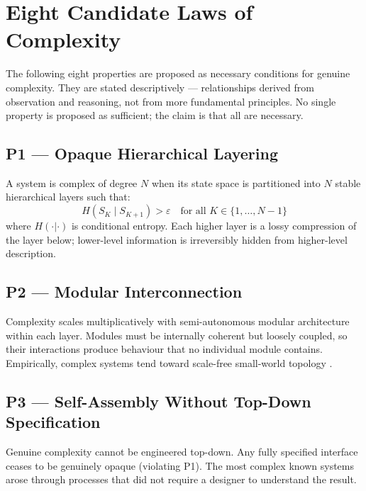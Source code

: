 \documentclass[12pt,a4paper]{article}
\begin{document}
\section{Eight Candidate Laws of Complexity}

The following eight properties are proposed as necessary conditions for
genuine complexity.
They are stated descriptively --- relationships derived from observation and
reasoning, not from more fundamental principles.
No single property is proposed as sufficient; the claim is that all are
necessary.

\subsection{P1 --- Opaque Hierarchical Layering}

A system is complex of degree $N$ when its state space is partitioned
into $N$ stable hierarchical layers such that:
\begin{equation}
H(S_K \mid S_{K+1}) > \varepsilon \quad \text{for all } K \in \{1,\ldots,N-1\}
\end{equation}
where $H(\cdot|\cdot)$ is conditional entropy.
Each higher layer is a lossy compression of the layer below; lower-level
information is irreversibly hidden from higher-level description.

\subsection{P2 --- Modular Interconnection}

Complexity scales multiplicatively with semi-autonomous modular architecture
within each layer.
Modules must be internally coherent but loosely coupled, so their interactions
produce behaviour that no individual module contains.
Empirically, complex systems tend toward scale-free small-world topology
\citep{watts1998,barabasi1999}.

\subsection{P3 --- Self-Assembly Without Top-Down Specification}

Genuine complexity cannot be engineered top-down.
Any fully specified interface ceases to be genuinely opaque (violating P1).
The most complex known systems arose through processes that did not require
a designer to understand the result.
\end{document}
